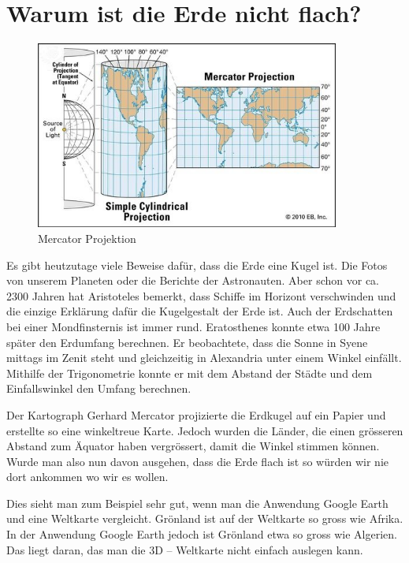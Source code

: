 

\section{Warum ist die Erde nicht flach?}

\begin{figure}
	\begin{center}
		\includegraphics[width=10cm]{papers/nav/bilder/projektion.png}
		\caption[Mercator Projektion]{Mercator Projektion}
	\end{center}	
\end{figure}

Es gibt heutzutage viele Beweise dafür, dass die Erde eine Kugel ist. 
Die Fotos von unserem	Planeten oder die Berichte der Astronauten. 
Aber schon vor ca. 2300 Jahren hat Aristoteles bemerkt, dass Schiffe im Horizont verschwinden und die einzige Erklärung dafür die Kugelgestalt der Erde ist.
Auch der Erdschatten bei einer Mondfinsternis ist immer rund.
Eratosthenes konnte etwa 100 Jahre später den Erdumfang berechnen. 
Er beobachtete, dass die Sonne in Syene mittags im Zenit steht und gleichzeitig in Alexandria unter einem Winkel einfällt. 
Mithilfe der Trigonometrie konnte er mit dem Abstand der Städte und dem Einfallswinkel den Umfang berechnen.

Der Kartograph Gerhard Mercator projizierte die Erdkugel auf ein Papier und erstellte so eine winkeltreue Karte. 
Jedoch wurden die Länder, die einen grösseren Abstand zum Äquator haben vergrössert, damit die Winkel stimmen können. 
Wurde man also nun davon ausgehen, dass die Erde flach ist so würden wir nie dort ankommen wo wir es wollen.

Dies sieht man zum Beispiel sehr gut, wenn man die Anwendung Google Earth und eine Weltkarte vergleicht. 
Grönland ist auf der Weltkarte so gross wie Afrika. 
In der Anwendung Google Earth jedoch ist Grönland etwa so gross wie Algerien. 
Das liegt daran, das man die 3D – Weltkarte nicht einfach auslegen kann. 

